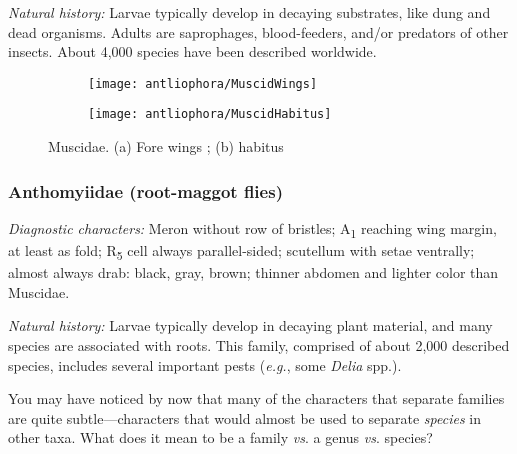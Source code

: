 \noindent{}\textit{Natural history:} Larvae typically develop in decaying substrates, like dung and dead organisms. Adults are saprophages, blood-feeders, and/or predators of other insects. About 4,000 species have been described worldwide.

\begin{figure}[ht!]
    \centering
    \begin{subfigure}[ht!]{0.4\textwidth}
        \texttt{[image: antliophora/MuscidWings]}
        \caption{}
        \label{fig:muscid1}
    \end{subfigure}
    \qquad
    \begin{subfigure}[ht!]{0.45\textwidth}
        \texttt{[image: antliophora/MuscidHabitus]}
        \caption{}
        \label{fig:muscid2}
    \end{subfigure}
    \caption{Muscidae. (a) Fore wings \citep[][Fig. 105.22,24]{mcalpine1981manualv2}; (b) habitus \citep[][Fig. 105.1]{mcalpine1981manualv2}}\label{fig:muscids}
\end{figure}

\subsubsection{Anthomyiidae (root-maggot flies)}
\noindent{}\textit{Diagnostic characters:} Meron without row of bristles; \texorpdfstring{A\textsubscript{1}}{A1} reaching wing margin, at least as fold; \texorpdfstring{R\textsubscript{5}}{R5} cell always parallel-sided; scutellum with setae ventrally; almost always drab: black, gray, brown; thinner abdomen and lighter color than Muscidae.\vspace{3mm}

\noindent{}\textit{Natural history:} Larvae typically develop in decaying plant material, and many species are associated with roots. This family, comprised of about 2,000 described species, includes several important pests (\textit{e.g.}, some \textit{Delia} spp.).\vspace{3mm}

\begin{theo}
{}You may have noticed by now that many of the characters that separate families are quite subtle---characters that would almost be used to separate \textit{species} in other taxa. What does it mean to be a family \textit{vs}. a genus \textit{vs}. species?
\end{theo}

